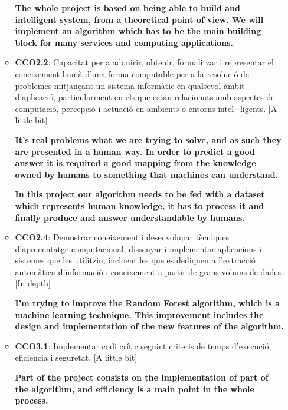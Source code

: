 \documentclass[a4paper]{article}
\begin{document}
\begin{enumerate}
\begin{itemize}
            \textbf{The whole project is based on being able to build and intelligent system, from a theoretical point of view. We will implement an algorithm which has to be the main building block for many services and computing applications.}

            \item \textbf{CCO2.2}: Capacitat per a adquirir, obtenir, formalitzar i representar el coneixement humà d'una forma computable per a la resolució de problemes mitjançant un sistema informàtic en qualsevol àmbit d'aplicació, particularment en els que estan relacionats amb aspectes de computació, percepció i actuació en ambients o entorns intel·ligents. [A little bit]

            \textbf{It's real problems what we are trying to solve, and as such they are presented in a human way. In order to predict a good answer it is required a good mapping from the knowledge owned by humans to something that machines can understand.}

            \textbf{In this project our algorithm needs to be fed with a dataset which represents human knowledge, it has to process it and finally produce and answer understandable by humans.}

            \item \textbf{CCO2.4}: Demostrar coneixement i desenvolupar tècniques d'aprenentatge computacional; dissenyar i implementar aplicacions i sistemes que les utilitzin, incloent les que es dediquen a l'extracció automàtica d'informació i coneixement a partir de grans volums de dades. [In depth]

            \textbf{I'm trying to improve the Random Forest algorithm, which is a machine learning technique. This improvement includes the design and implementation of the new features of the algorithm.}

            \item \textbf{CCO3.1}: Implementar codi crític seguint criteris de temps d'execució, eficiència i seguretat. [A little bit]

            \textbf{Part of the project consists on the implementation of part of the algorithm, and efficiency is a main point in the whole process.}

        \end{itemize}

    \end{enumerate}

\end{document}
